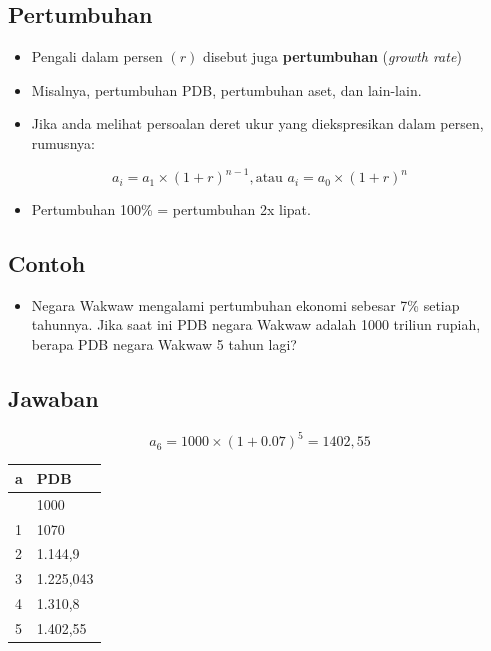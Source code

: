 \documentclass[
  letterpaper,
  DIV=11,
  numbers=noendperiod]{scrartcl}
\providecommand{\tightlist}{%
  \setlength{\itemsep}{0pt}\setlength{\parskip}{0pt}}\usepackage{longtable,booktabs,array}
\begin{document}
\subsection{Pertumbuhan}\label{pertumbuhan}

\begin{itemize}
\item
  Pengali dalam persen \((r)\) disebut juga \textbf{pertumbuhan}
  (\emph{growth rate})
\item
  Misalnya, pertumbuhan PDB, pertumbuhan aset, dan lain-lain.
\item
  Jika anda melihat persoalan deret ukur yang diekspresikan dalam
  persen, rumusnya:
\end{itemize}

\[
a_i=a_1\times (1+r)^{n-1}, \text{atau } a_i=a_0 \times (1+r)^{n}
\]

\begin{itemize}
\tightlist
\item
  Pertumbuhan 100\% = pertumbuhan 2x lipat.
\end{itemize}

\subsection{Contoh}\label{contoh-4}

\begin{itemize}
\tightlist
\item
  Negara Wakwaw mengalami pertumbuhan ekonomi sebesar 7\% setiap
  tahunnya. Jika saat ini PDB negara Wakwaw adalah 1000 triliun rupiah,
  berapa PDB negara Wakwaw 5 tahun lagi?
\end{itemize}

\subsection{Jawaban}\label{jawaban-1}

\[a_6=1000 \times (1+0.07)^5=1402,55\]

\begin{longtable}[]{@{}ll@{}}
\toprule\noalign{}
a & PDB \\
\midrule\noalign{}
\endhead
\bottomrule\noalign{}
\endlastfoot
0 & 1000 \\
1 & 1070 \\
2 & 1.144,9 \\
3 & 1.225,043 \\
4 & 1.310,8 \\
5 & 1.402,55 \\
\end{longtable}
\end{document}
